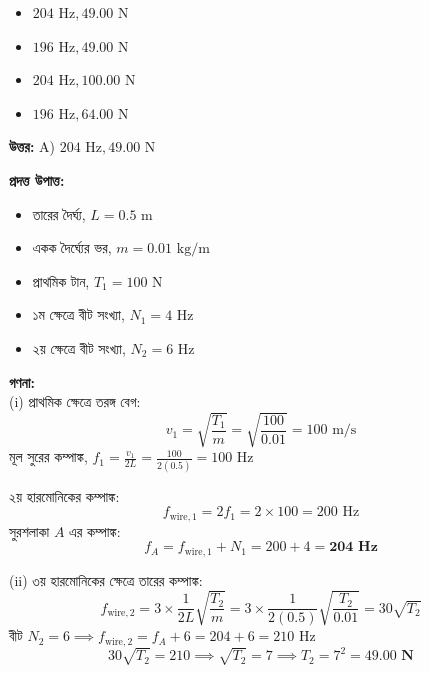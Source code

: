 \documentclass[12pt, a4paper]{article}
\begin{document}
\begin{itemize}[label={}, leftmargin=1cm, itemsep=0.5em]
    \item[\textbf{A)}] $204\text{ Hz}, 49.00\text{ N}$
    \item[\textbf{B)}] $196\text{ Hz}, 49.00\text{ N}$
    \item[\textbf{C)}] $204\text{ Hz}, 100.00\text{ N}$
    \item[\textbf{D)}] $196\text{ Hz}, 64.00\text{ N}$
\end{itemize}

\vspace{0.5em}
\begin{tcolorbox}[answerbox]
    \textbf{\color{success} উত্তর:} A) $204\text{ Hz}, 49.00\text{ N}$
\end{tcolorbox}
\vspace{1em}

\begin{tcolorbox}[solutionbox={সমাধান (Solution)}]
    \noindent
    \textbf{প্রদত্ত উপাত্ত:}
    \begin{itemize}[leftmargin=1.5em, itemsep=0.2em]
        \item তারের দৈর্ঘ্য, $L = 0.5\text{ m}$
        \item একক দৈর্ঘ্যের ভর, $m = 0.01\text{ kg/m}$
        \item প্রাথমিক টান, $T_1 = 100\text{ N}$
        \item ১ম ক্ষেত্রে বীট সংখ্যা, $N_1 = 4\text{ Hz}$
        \item ২য় ক্ষেত্রে বীট সংখ্যা, $N_2 = 6\text{ Hz}$
    \end{itemize}

    \vspace{0.6em}
    \noindent\textbf{গণনা:} \\
    (i) প্রাথমিক ক্ষেত্রে তরঙ্গ বেগ:
    \[ v_1 = \sqrt{\frac{T_1}{m}} = \sqrt{\frac{100}{0.01}} = 100\text{ m/s} \]
    মূল সুরের কম্পাঙ্ক, $f_1 = \frac{v_1}{2L} = \frac{100}{2(0.5)} = 100\text{ Hz}$
    
    ২য় হারমোনিকের কম্পাঙ্ক:
    \[ f_{\text{wire},1} = 2 f_1 = 2 \times 100 = 200\text{ Hz} \]
    সুরশলাকা $A$ এর কম্পাঙ্ক:
    \[ f_A = f_{\text{wire},1} + N_1 = 200 + 4 = \mathbf{204\text{ Hz}} \]
    
    (ii) ৩য় হারমোনিকের ক্ষেত্রে তারের কম্পাঙ্ক:
    \[ f_{\text{wire},2} = 3 \times \frac{1}{2L} \sqrt{\frac{T_2}{m}} = 3 \times \frac{1}{2(0.5)} \sqrt{\frac{T_2}{0.01}} = 30 \sqrt{T_2} \]
    বীট $N_2 = 6 \implies f_{\text{wire},2} = f_A + 6 = 204 + 6 = 210\text{ Hz}$
    \[ 30 \sqrt{T_2} = 210 \implies \sqrt{T_2} = 7 \implies T_2 = 7^2 = \mathbf{49.00\text{ N}} \]
\end{tcolorbox}
\end{document}
